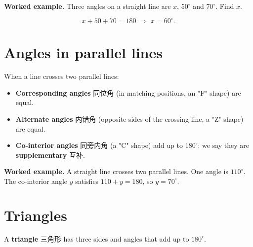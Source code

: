 \documentclass[11pt]{article}
\begin{document}
\textbf{Worked example.} Three angles on a straight line are $x$, $50^{\circ}$ and $70^{\circ}$. Find $x$.

\[
x + 50 + 70 = 180 \;\Rightarrow\; x = 60^{\circ}.
\]

\section*{Angles in parallel lines}

When a line crosses two parallel lines:

\begin{itemize}
\item \textbf{Corresponding angles} 同位角 (in matching positions, an "F" shape) are equal.

\item \textbf{Alternate angles} 内错角 (opposite sides of the crossing line, a "Z" shape) are equal.

\item \textbf{Co-interior angles} 同旁内角 (a "C" shape) add up to $180^{\circ}$; we say they are \textbf{supplementary} 互补.

\end{itemize}

\textbf{Worked example.} A straight line crosses two parallel lines. One angle is $110^{\circ}$. The co-interior angle $y$ satisfies $110 + y = 180$, so $y = 70^{\circ}$.

\section*{Triangles}

A \textbf{triangle} 三角形 has three sides and angles that add up to $180^{\circ}$.

\begin{center}
\end{center}
\end{document}
